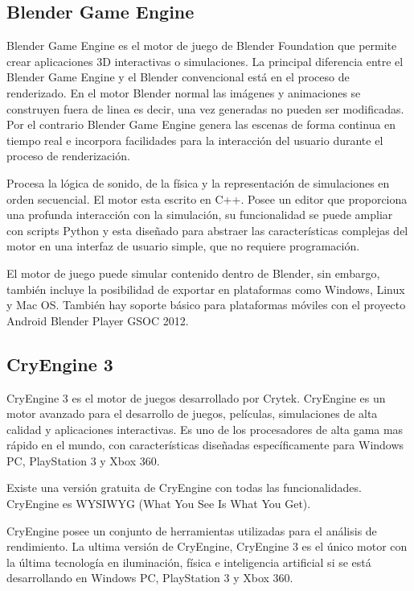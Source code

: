 \subsection{Blender Game Engine}

Blender Game Engine\cite{blender} es el motor de juego de Blender Foundation que permite crear aplicaciones 3D interactivas o simulaciones. La principal diferencia entre el Blender Game Engine y el Blender convencional está en el proceso de renderizado. En el motor Blender normal las imágenes y animaciones se construyen fuera de linea es decir, una vez generadas no pueden ser modificadas. Por el contrario Blender Game Engine genera las escenas de forma continua en tiempo real e incorpora facilidades para la interacción del usuario durante el proceso de renderización.

Procesa la lógica de sonido, de la física y la representación de simulaciones en orden secuencial. El motor esta
escrito en C++. Posee un editor que proporciona una profunda interacción con la simulación, su funcionalidad se
puede ampliar con scripts Python y esta diseñado para abstraer las características complejas del motor en una interfaz de usuario simple, que no requiere programación.

El motor de juego puede simular contenido dentro de Blender, sin embargo, también incluye la posibilidad de exportar en plataformas como Windows, Linux y Mac OS. También hay soporte básico para plataformas móviles con el proyecto Android Blender Player GSOC 2012.

\subsection{CryEngine 3}

CryEngine 3\cite{cryengine} es el motor de juegos desarrollado por Crytek. CryEngine es un motor avanzado para el desarrollo de juegos, películas, simulaciones de alta calidad y aplicaciones interactivas. Es uno de los procesadores de alta gama mas rápido en el mundo, con características diseñadas específicamente para Windows PC, PlayStation 3 y Xbox 360.

Existe una versión gratuita de CryEngine con todas las funcionalidades. CryEngine es  WYSIWYG (What You See Is What You Get). 

CryEngine posee un conjunto de herramientas utilizadas para el análisis de rendimiento. La ultima versión
de CryEngine, CryEngine 3 es el único motor con la última tecnología en iluminación, física e inteligencia
artificial si se está desarrollando en Windows PC, PlayStation 3 y Xbox 360.


